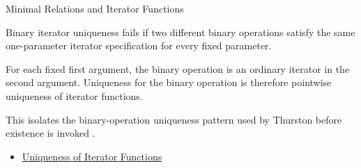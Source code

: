 \begin{topicbox}{Minimal Relations and Iterator Functions}
\begin{remark*}
Binary iterator uniqueness fails if two different binary operations satisfy
the same one-parameter iterator specification for every fixed parameter.
\end{remark*}

\begin{remark*}[Interpretation]
For each fixed first argument, the binary operation is an ordinary iterator in
the second argument. Uniqueness for the binary operation is therefore
pointwise uniqueness of iterator functions.
\end{remark*}

\begin{remark*}
This isolates the binary-operation uniqueness pattern used by Thurston before
existence is invoked \citep{thurston1956numbersystem}.
\end{remark*}

\begin{remark*}[Dependencies]
\begin{itemize}
  \item \hyperref[lem:uniqueness-of-iterator-functions]{Uniqueness of Iterator Functions}
\end{itemize}
\end{remark*}
\end{topicbox}

